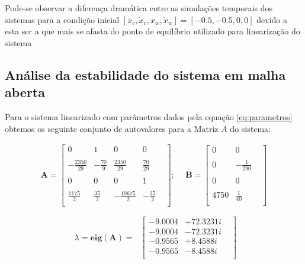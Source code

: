 \documentclass[a4paper]{ifacconf}
\begin{document}
    Pode-se observar a diferença dramática entre as simulações temporais dos sistemas para a condição inicial $[x_c, \dot{x}_c, x_w, \dot{x}_w]=[-0.5,-0.5,0,0]$ devido a esta ser a que mais se afasta do ponto de equilíbrio utilizado para linearização do sistema
    
        \subsection{Análise da estabilidade do sistema em malha aberta}
    
    Para o sistema linearizado com parâmetros dados pela equação \ref{eq:parametros} obtemos os seguinte conjunto de autovalores para a Matriz $A$ do sistema:
    
    \begin{equation}
    \begin{split}
    \mathbf{A} =
        \begin{bmatrix}
               0&      1&        0&     0&\\ \\
               -\frac{2350}{29}& -\frac{70}{9}&  \frac{2350}{29}& \frac{70}{29}&\\ \\
               0&      0&        0&     1&\\ \\
                \frac{1175}{2}&   \frac{35}{2}& -\frac{10675}{2}& -\frac{35}{2}&\\ 
        \end{bmatrix}; \ \
    \end{split}
   \begin{split}
   \mathbf{B} =
        \begin{bmatrix}
               0&      0&\\ \\
               0& -\frac{1}{290}&\\ \\
               0&      0&\\ \\
            4750&   \frac{1}{40}&\\
        \end{bmatrix}
   \end{split}     
    \end{equation}
    
    \begin{equation} \label{eq:autovalores}
        \begin{split}
             \lambda=\mathbf{eig(A)}=\
        \end{split}
        \begin{bmatrix}
            -9.0004& +72.3231i&\\
            -9.0004& -72.3231i&\\
            -0.9565& + 8.4588i&\\
            -0.9565& - 8.4588i&\\
        \end{bmatrix}
    \end{equation}
        
\end{document}
